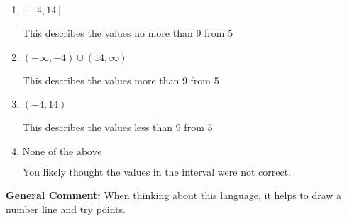 \documentclass{extbook}[14pt]
\begin{document}
\begin{enumerate}
{\begin{enumerate}[label=\Alph*.]
This describes the values no less than 9 from 5
\item \( [-4, 14] \)

This describes the values no more than 9 from 5
\item \( (-\infty, -4) \cup (14, \infty) \)

This describes the values more than 9 from 5
\item \( (-4, 14) \)

This describes the values less than 9 from 5
\item \( \text{None of the above} \)

You likely thought the values in the interval were not correct.
\end{enumerate}

\textbf{General Comment:} When thinking about this language, it helps to draw a number line and try points.
}
\end{enumerate}
\end{document}
